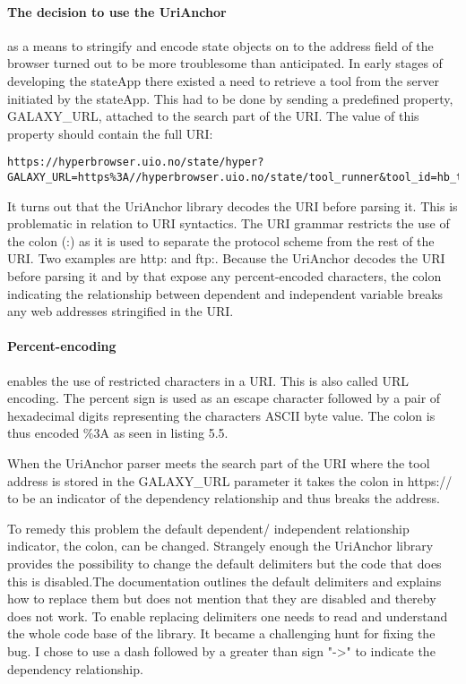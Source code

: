 \documentclass[english]{ifimaster}
\begin{document}
\paragraph{The decision to use the UriAnchor} as a means to stringify and encode state objects on to the address field of the browser turned out to be more troublesome than anticipated. In early stages of developing the stateApp there existed a need to retrieve a tool from the server initiated by the stateApp. This had to be done by sending a predefined property, GALAXY\_URL, attached to the search part of the URI. The value of this property should contain the full URI:

\begin{lstlisting}[caption= The full URI to retrieve a hyperbrowser tool.]
https://hyperbrowser.uio.no/state/hyper?GALAXY_URL=https%3A//hyperbrowser.uio.no/state/tool_runner&tool_id=hb_test_1
\end{lstlisting}

It turns out that the UriAnchor library decodes the URI before parsing it. This is problematic in relation to URI syntactics. The URI grammar restricts the use of the colon (:) as it is used to separate the protocol scheme from the rest of the URI. Two examples are http: and ftp:. Because the UriAnchor decodes the URI before parsing it and by that expose any percent-encoded characters, the colon indicating the relationship between dependent and independent variable breaks any web addresses stringified in the URI. 

\paragraph{Percent-encoding} enables the use of restricted characters in a URI. This is also called URL encoding. The percent sign is used as an escape character followed by a pair of hexadecimal digits representing the characters ASCII byte value\parencite{urlencode}. The colon is thus encoded \%3A as seen in listing 5.5.

When the UriAnchor parser meets the search part of the URI where the tool address is stored in the GALAXY\_URL parameter it takes the colon in https:// to be an indicator of the dependency relationship and thus breaks the address.

To remedy this problem the default dependent/ independent relationship indicator, the colon, can be changed. Strangely enough the UriAnchor library provides the possibility to change the default delimiters but the code that does this is disabled.The documentation outlines the default delimiters and explains how to replace them but does not mention that they are disabled and thereby does not work. To enable replacing delimiters one needs to read and understand the whole code base of the library. It became a challenging hunt for fixing the bug. I chose to use a dash followed by a greater than sign "->" to indicate the dependency relationship.   
\end{document}
